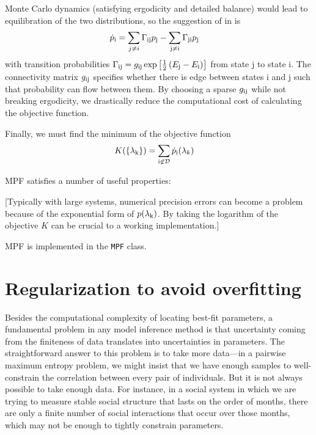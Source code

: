 \documentclass[aps,prl,twocolumn]{revtex4-1}
\begin{document}
Monte Carlo dynamics (satisfying ergodicity and detailed balance) would lead to equilibration of the two distributions, so the suggestion of in \cite{SohlDickstein:2011im} is
\begin{align}
	\dot{p}_{\rm i} &= \sum_{j\neq i} \Gamma_{\rm ij} p_{\rm j} -\sum_{\rm j\neq i} \Gamma_{\rm ji} p_{\rm j}
\end{align}
with transition probabilities $\Gamma_{\rm ij} = g_{\rm ij}\exp\left[ \frac{1}{2}\left( E_{\rm j}-E_{\rm i} \right) \right]$ from state j to state i. The connectivity matrix $g_{\rm ij}$ specifies whether there is edge between states i and j such that probability can flow between them. By choosing a sparse $g_{\rm ij}$ while not breaking ergodicity, we drastically reduce the computational cost of calculating the objective function.

Finally, we must find the minimum of the objective function
\begin{align}
	K(\{\lambda_{\rm k}\}) &= \sum_{\rm i \not\in \mathcal{D}} \dot{p}_{\rm i}(\lambda_k)
\end{align}

MPF satisfies a number of useful properties:

[Typically with large systems, numerical precision errors can become a problem because of the exponential form of $p(\lambda_{\rm k})$. By taking the logarithm of the objective $K$ can be crucial to a working implementation.]

MPF is implemented in the {\tt MPF} class.


\section{Regularization to avoid overfitting}

Besides the computational complexity of locating best-fit parameters,
a fundamental problem in any model inference method is that uncertainty coming
from the finiteness of data translates into uncertainties in parameters.
The straightforward answer to this problem is to take more data---in a pairwise
maximum entropy problem, we might insist that we have enough samples to well-constrain
the correlation between every pair of individuals.  But it is not always possible
to take enough data.  For instance, in a social system in which we are trying to
measure stable social structure that lasts on the order of months, there are only
a finite number of social interactions that occur over those months, which may
not be enough to tightly constrain parameters.
\end{document}
